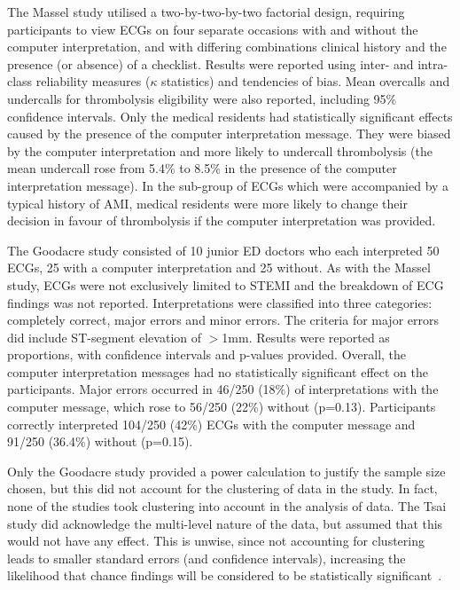 The Massel study utilised a two-by-two-by-two factorial design, requiring participants to view ECGs on four separate occasions with and without the computer interpretation, and with differing combinations clinical history and the presence (or absence) of a checklist. Results were reported using inter- and intra-class reliability measures ($  \kappa $ statistics) and tendencies of bias. Mean overcalls and undercalls for thrombolysis eligibility were also reported, including 95\% confidence intervals. Only the medical residents had statistically significant effects caused by the presence of the computer interpretation message. They were biased by the computer interpretation and more likely to undercall thrombolysis (the mean undercall rose from 5.4\% to 8.5\% in the presence of the computer interpretation message). In the sub-group of ECGs which were accompanied by a typical history of AMI, medical residents were more likely to change their decision in favour of thrombolysis if the computer interpretation was provided.

The Goodacre study consisted of 10 junior ED doctors who each interpreted 50 ECGs, 25 with a computer interpretation and 25 without. As with the Massel study, ECGs were not exclusively limited to STEMI and the breakdown of ECG findings was not reported. Interpretations were classified into three categories: completely correct, major errors and minor errors. The criteria for major errors did include ST-segment elevation of $>$1mm. Results were reported as proportions, with confidence intervals and p-values provided. Overall, the computer interpretation messages had no statistically significant effect on the participants. Major errors occurred in 46\slash 250 (18\%) of interpretations with the computer message, which rose to 56\slash 250 (22\%) without (p=0.13). Participants correctly interpreted 104\slash 250 (42\%) ECGs with the computer message and 91\slash 250 (36.4\%) without (p=0.15).

Only the Goodacre study provided a power calculation to justify the sample size chosen, but this did not account for the clustering of data in the study. In fact, none of the studies took clustering into account in the analysis of data. The Tsai study did acknowledge the multi-level nature of the data, but assumed that this would not have any effect. This is unwise, since not accounting for clustering leads to smaller standard errors (and confidence intervals), increasing the likelihood that chance findings will be considered to be statistically significant~\citep{bland_statistics_1997}. 


